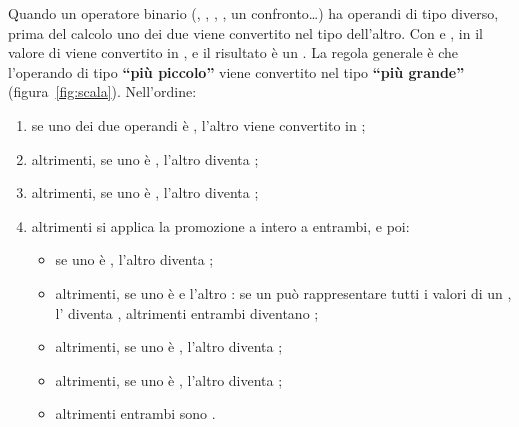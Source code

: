 Quando un operatore binario (\code{+}, \code{-}, \code{*}, \code{/}, un
confronto\dots) ha operandi di tipo diverso, prima del calcolo uno dei due
viene convertito nel tipo dell'altro. Con  e ,
in  il valore di  viene convertito in , e il
risultato è un . La regola generale è che l'operando di tipo
\textbf{“più piccolo”} viene convertito nel tipo \textbf{“più grande”}
(figura~\ref{fig:scala}). Nell'ordine:

\begin{enumerate}
  \item se uno dei due operandi è , l'altro viene
        convertito in ;
  \item altrimenti, se uno è , l'altro diventa ;
  \item altrimenti, se uno è , l'altro diventa ;
  \item altrimenti si applica la promozione a intero a entrambi, e poi:
        \begin{itemize}
          \item se uno è , l'altro diventa
                ;
          \item altrimenti, se uno è  e l'altro
                : se un  può rappresentare tutti i
                valori di un , l' diventa
                , altrimenti entrambi diventano
                ;
          \item altrimenti, se uno è , l'altro diventa
                ;
          \item altrimenti, se uno è , l'altro diventa
                ;
          \item altrimenti entrambi sono .
        \end{itemize}
\end{enumerate}

